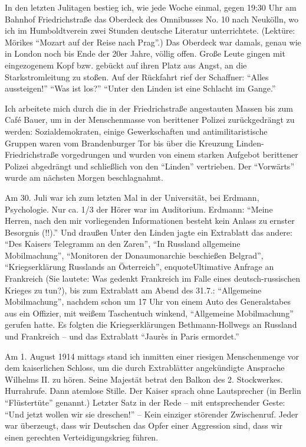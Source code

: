 In den letzten Julitagen bestieg ich, wie jede Woche einmal, gegen 19:30 Uhr am Bahnhof Friedrichstraße das Oberdeck des Omnibusses No. 10 nach Neukölln, wo ich im Humboldtverein zwei Stunden deutsche Literatur unterrichtete. (Lektüre: Mörikes \enquote{Mozart auf der Reise nach Prag}.) Das Oberdeck war damals, genau wie in London noch bis Ende der 20er Jahre, völlig offen. Große Leute gingen mit eingezogenem Kopf bzw. gebückt auf ihren Platz aus Angst, an die Starkstromleitung zu stoßen. Auf der Rückfahrt rief der Schaffner: \enquote{Alles aussteigen!} \enquote{Was ist los?} \enquote{Unter den Linden ist eine Schlacht im Gange.}

Ich arbeitete mich durch die in der Friedrichstraße angestauten Massen bis zum Café Bauer, um in der Menschenmasse von berittener Polizei zurückgedrängt zu werden: Sozialdemokraten, einige Gewerkschaften und antimilitaristische Gruppen waren vom Brandenburger Tor bis über die Kreuzung Linden-Friedrichstraße vorgedrungen und wurden von einem starken Aufgebot berittener Polizei abgedrängt und schließlich von den \enquote{Linden} vertrieben. Der \enquote{Vorwärts} wurde am nächsten Morgen beschlagnahmt.

Am 30. Juli war ich zum letzten Mal in der Universität, bei Erdmann, Psychologie. Nur ca. 1/3 der Hörer war im Auditorium. Erdmann: \enquote{Meine Herren, nach den mir vorliegenden Informationen besteht kein Anlass zu ernster Besorgnis (!!).} Und draußen Unter den Linden jagte ein Extrablatt das andere: \enquote{Des Kaisers Telegramm an den Zaren}, \enquote{In Russland allgemeine Mobilmachung}, \enquote{Monitoren der Donaumonarchie beschießen Belgrad}, \enquote{Kriegserklärung Russlands an Österreich}, enquote{Ultimative Anfrage an Frankreich} (Sie lautete: Was gedenkt Frankreich im Falle eines deutsch-russischen Krieges zu tun?), bis zum Extrablatt am Abend des 31.7.: \enquote{Allgemeine Mobilmachung}, nachdem schon um 17 Uhr von einem Auto des Generalstabes aus ein Offizier, mit weißem Taschentuch winkend, \enquote{Allgemeine Mobilmachung} gerufen hatte. Es folgten die Kriegserklärungen Bethmann-Hollwegs an Russland und Frankreich -- und das Extrablatt \enquote{Jaurès in Paris ermordet.}

Am 1. August 1914 mittags stand ich inmitten einer riesigen Menschenmenge vor dem kaiserlichen Schloss, um die durch Extrablätter angekündigte Ansprache Wilhelms II. zu hören. Seine Majestät betrat den Balkon des 2. Stockwerkes. Hurrahrufe. Dann atemlose Stille. Der Kaiser sprach ohne Lautsprecher (in Berlin \enquote{Flüstertüte} genannt.) Letzter Satz in der Rede -- mit entsprechender Geste: \enquote{Und jetzt wollen wir sie dreschen!} -- Kein einziger störender Zwischenruf. Jeder war überzeugt, dass wir Deutschen das Opfer einer Aggression sind, dass wir einen gerechten Verteidigungskrieg führen.

